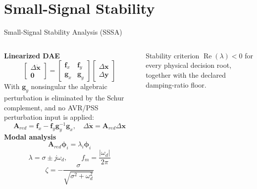 \documentclass{beamer}
\begin{document}
\section{Small-Signal Stability}
\begin{frame}{Small-Signal Stability Analysis (SSSA)}
\begin{columns}[c,onlytextwidth]
\small
\textbf{Linearized DAE}
\[
\begin{bmatrix}\Delta\dot{\bm x}\\\bm 0\end{bmatrix}
=\begin{bmatrix}\bm f_x&\bm f_y\\\bm g_x&\bm g_y\end{bmatrix}
\begin{bmatrix}\Delta\bm x\\\Delta\bm y\end{bmatrix}
\]
With $\bm g_y$ nonsingular the algebraic perturbation is eliminated by the Schur complement, and no AVR/PSS perturbation input is applied:
\[
\boxed{\bm A_{red}=\bm f_x-\bm f_y\bm g_y^{-1}\bm g_x},\quad
\Delta\dot{\bm x}=\bm A_{red}\Delta\bm x
\]
\small
\textbf{Modal analysis}
\[
\boxed{\bm A_{red}\bm\phi_i=\lambda_i\bm\phi_i}
\]
\[
\lambda=\sigma\pm j\omega_d,\qquad
f_m=\frac{|\omega_d|}{2\pi}
\]
\[
\zeta=-\frac{\sigma}{\sqrt{\sigma^2+\omega_d^2}}
\]
\begin{block}{Stability criterion}
$\operatorname{Re}(\lambda)<0$ for every physical decision root, together with the declared damping-ratio floor.
\end{block}
\end{columns}
\end{frame}
\end{document}

